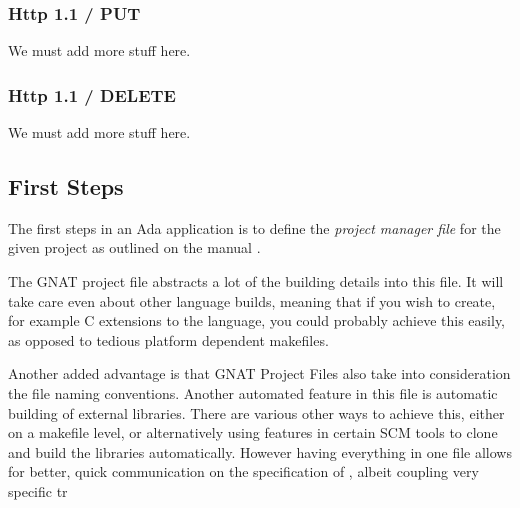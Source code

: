 \subsubsection{Http 1.1 / PUT}
We must add more stuff here.

\subsubsection{Http 1.1 / DELETE} 
We must add more stuff here.

\subsection{First Steps}
The first steps in an Ada application is to define the \textit{project manager 
file} for the given project as outlined on the manual \cite{GNATintro}.

The GNAT project file abstracts a lot of the building details into this file.
It will take care even about other language builds, meaning that if you wish
to create, for example C extensions to the language, you could probably achieve
this easily, as opposed to tedious platform dependent makefiles. 

Another added advantage is that GNAT Project Files also take into consideration 
the file naming conventions. Another automated feature in this file is automatic
building of external libraries. There are various other ways to achieve this,
either on a makefile level, or alternatively using features in certain SCM tools
to clone and build the libraries automatically. However having everything in one
file allows for better, quick communication on the specification of ,
albeit coupling very specific tr

